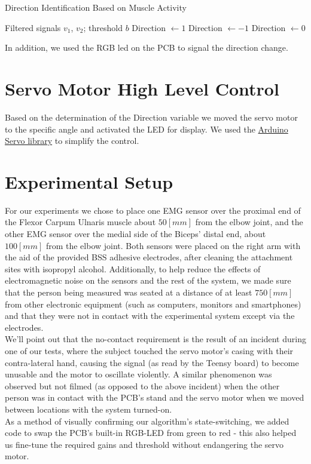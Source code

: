 \documentclass[10pt]{article}
\begin{document}
\begin{algorithm}
\caption{Direction Identification Based on Muscle Activity}
\begin{algorithmic}[1]
\REQUIRE Filtered signals $v_1$, $v_2$; threshold $b$
        \STATE Direction $\gets 1$
    \ELSE
        \STATE Direction $\gets -1$
    \ENDIF
\ELSE
    \STATE Direction $\gets 0$
\ENDIF
\end{algorithmic}
\end{algorithm}
In addition, we used the RGB led on the PCB to signal the direction change.
\section{Servo Motor High Level Control}
Based on the determination of the Direction variable we moved the servo motor to the specific angle and activated the LED for display. 
We used the \href{https://docs.arduino.cc/libraries/servo/}{Arduino Servo library} to simplify the control.  
\section{Experimental Setup}
For our experiments we chose to place one EMG sensor over the proximal end of the Flexor Carpum Ulnaris muscle about $50[mm]$ from the elbow joint, and the other EMG sensor over the medial side of the Biceps' distal end, about $100[mm]$ from the elbow joint. Both sensors were placed on the right arm with the aid of the provided BSS adhesive electrodes, after cleaning the attachment sites with isopropyl alcohol. Additionally, to help reduce the effects of electromagnetic noise on the sensors and the rest of the system, we made sure that the person being measured was seated at a distance of at least $750[mm]$ from other electronic equipment (such as computers, monitors and smartphones) and that they were not in contact with the experimental system except via the electrodes.\\
We'll point out that the no-contact requirement is the result of an incident during one of our tests, where the subject touched the servo motor's casing with their contra-lateral hand, causing the signal (as read by the Teensy board) to become unusable and the motor to oscillate violently. A similar phenomenon was observed but not filmed (as opposed to the above incident) when the other person was in contact with the PCB's stand and the servo motor when we moved between locations with the system turned-on.\\
As a method of visually confirming our algorithm's state-switching, we added code to swap the PCB's built-in RGB-LED from green to red - this also helped us fine-tune the required gains and threshold without endangering the servo motor. 
\end{document}
